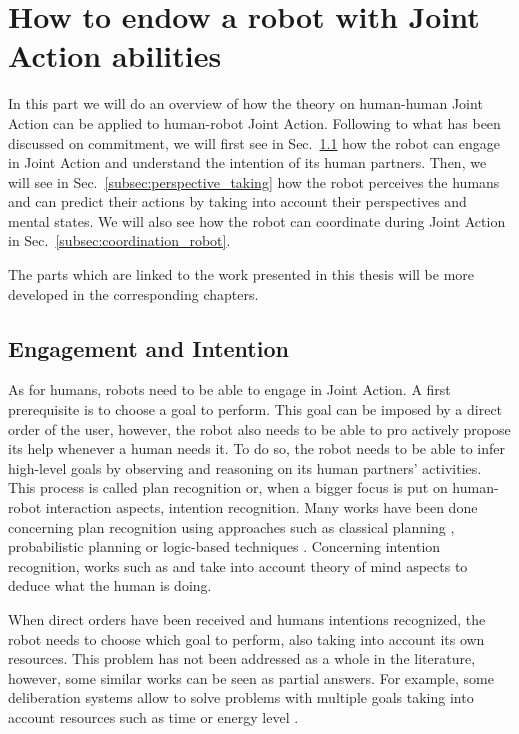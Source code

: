 \documentclass[english,a4paper,11pt,twoside]{StyleThese}
\begin{document}
\section{How to endow a robot with Joint Action abilities}

In this part we will do an overview of how the theory on human-human Joint Action can be applied to human-robot Joint Action. Following to what has been discussed on commitment, we will first see in Sec.~\ref{subsec:engagement} how the robot can engage in Joint Action and understand the intention of its human partners. Then, we will see in Sec.~\ref{subsec:perspective_taking} how the robot perceives the humans and can predict their actions by taking into account their perspectives and mental states. We will also see how the robot can coordinate during Joint Action in Sec.~\ref{subsec:coordination_robot}.

The parts which are linked to the work presented in this thesis will be more developed in the corresponding chapters.

\subsection{Engagement and Intention}

\label{subsec:engagement}

As for humans, robots need to be able to engage in Joint Action. A first prerequisite is to choose a goal to perform. This goal can be imposed by a direct order of the user, however, the robot also needs to be able to pro actively propose its help whenever a human needs it. To do so, the robot needs to be able to infer high-level goals by observing and reasoning on its human partners’ activities. This process is called plan recognition or, when a bigger focus is put on human-robot interaction aspects, intention recognition. Many works have been done concerning plan recognition using approaches such as classical planning \cite{ramirez2009plan}, probabilistic planning \cite{bui2003general} or logic-based techniques \cite{singla2011abductive}. Concerning intention recognition, works such as \cite{breazeal2009embodied} and \cite{baker2014modeling} take into account theory of mind aspects to deduce what the human is doing.

When direct orders have been received and humans intentions recognized, the robot needs to choose which goal to perform, also taking into account its own resources. This problem has not been addressed as a whole in the literature, however, some similar works can be seen as partial answers. For example, some deliberation systems allow to solve problems with multiple goals taking into account resources such as time \cite{georgeff1987reactive, ghallab1994representation, lemai2004interleaving} or energy level \cite{rabideau1999iterative}.
\end{document}
